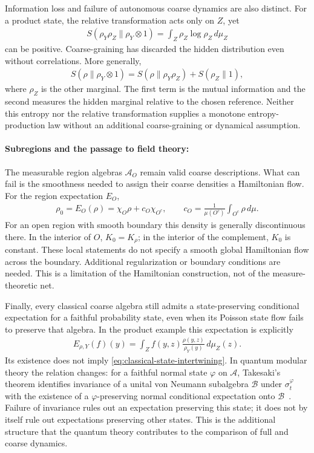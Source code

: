 \documentclass[a4paper,11pt]{article}
\theoremstyle{definition}
\newcommand{\mA}{\mathcal{A}}
\newcommand{\mB}{\mathcal{B}}
\begin{document}
Information loss and failure of autonomous coarse dynamics are also distinct. For a product state, the relative transformation acts only on $Z$, yet
\begin{align}
    S(\rho_Y\rho_Z\|\rho_Y\otimes1)
    =\int_Z\rho_Z\log\rho_Z\,d\mu_Z
\end{align}
can be positive. Coarse-graining has discarded the hidden distribution even without correlations. More generally,
\begin{align}
    S(\rho\|\rho_Y\otimes1)
    =S(\rho\|\rho_Y\rho_Z)+S(\rho_Z\|1),
\end{align}
where $\rho_Z$ is the other marginal. The first term is the mutual information and the second measures the hidden marginal relative to the chosen reference. Neither this entropy nor the relative transformation supplies a monotone entropy-production law without an additional coarse-graining or dynamical assumption.

\paragraph{Subregions and the passage to field theory:}
The measurable region algebras $\mA_O$ remain valid coarse descriptions. What can fail is the smoothness needed to assign their coarse densities a Hamiltonian flow. For the region expectation $E_O$,
\begin{align}
    \rho_0=E_O(\rho)=\chi_O\rho+c_O\chi_{O^c},\qquad
    c_O=\frac{1}{\mu(O^c)}\int_{O^c}\rho\,d\mu.
\end{align}
For an open region with smooth boundary this density is generally discontinuous there. In the interior of $O$, $K_0=K_\rho$; in the interior of the complement, $K_0$ is constant. These local statements do not specify a smooth global Hamiltonian flow across the boundary. Additional regularization or boundary conditions are needed. This is a limitation of the Hamiltonian construction, not of the measure-theoretic net.

Finally, every classical coarse algebra still admits a state-preserving conditional expectation for a faithful probability state, even when its Poisson state flow fails to preserve that algebra. In the product example this expectation is explicitly
\begin{align}
    E_{\rho,Y}(f)(y)=\int_Z f(y,z)\frac{\rho(y,z)}{\rho_Y(y)}\,d\mu_Z(z).
\end{align}
Its existence does not imply \eqref{eq:classical-state-intertwining}. In quantum modular theory the relation changes: for a faithful normal state $\varphi$ on $\mA$, Takesaki's theorem identifies invariance of a unital von Neumann subalgebra $\mB$ under $\sigma_t^\varphi$ with the existence of a $\varphi$-preserving normal conditional expectation onto $\mB$~\cite{Takesaki1972}. Failure of invariance rules out an expectation preserving this state; it does not by itself rule out expectations preserving other states. This is the additional structure that the quantum theory contributes to the comparison of full and coarse dynamics.
\end{document}
